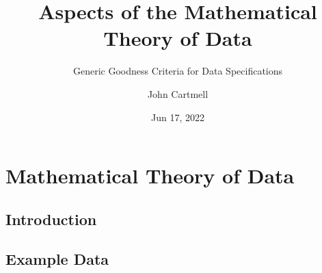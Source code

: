 

\usepackage{mathptmx}
\usepackage{amsfonts}
\usepackage{wasysym}
\usepackage{url}
\usepackage{hyperref}


\newcommand{\sharedmacros}{../../SharedMacros}










\renewcommand{\erpictureFolder}[0]{../../SharedPictures}
\setcounter{equation}{0}


\title[John Cartmell]{Aspects of the Mathematical Theory of Data}
\subtitle{Generic Goodness Criteria for Data Specifications}
\author{John Cartmell}
\date{Jun 17, 2022}

\usepackage{framed}
\usepackage{bibentry}
\usepackage{colortbl}
\usepackage{ulem}   %
\usepackage{listings}
\usepackage{arydshln} %
\usepackage{pst-arrow} %

\nobibliography*



\begin{frame}
\titlepage
\end{frame}


\section{Mathematical Theory of Data}

\subsection{Introduction}


\subsection{Example Data}


